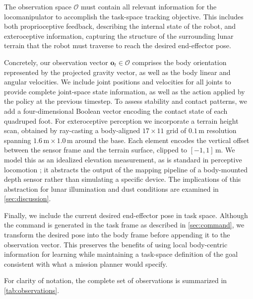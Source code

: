 The observation space $\mathcal{O}$ must contain all relevant information for the locomanipulator to accomplish the task-space tracking objective. This includes both proprioceptive feedback, describing the internal state of the robot, and exteroceptive information, capturing the structure of the surrounding lunar terrain that the robot must traverse to reach the desired end-effector pose.

Concretely, our observation vector $\boldsymbol{o}_t \in \mathcal{O}$ comprises the body orientation represented by the projected gravity vector, as well as the body linear and angular velocities. We include joint positions and velocities for all joints to provide complete joint-space state information, as well as the action applied by the policy at the previous timestep. To assess stability and contact patterns, we add a four-dimensional Boolean vector encoding the contact state of each quadruped foot. For exteroceptive perception we incorporate a terrain height scan, obtained by ray-casting a body-aligned $17\times11$ grid of $0.1\,$m resolution spanning $1.6\,\mathrm{m}\times1.0\,\mathrm{m}$ around the base. Each element encodes the vertical offset between the sensor frame and the terrain surface, clipped to $[-1,1]\,$m. We model this as an idealized elevation measurement, as is standard in perceptive locomotion \citep{MikiWildAnymal}; it abstracts the output of the mapping pipeline of a body-mounted depth sensor rather than simulating a specific device. The implications of this abstraction for lunar illumination and dust conditions are examined in \cref{sec:discussion}.

Finally, we include the current desired end-effector pose in task space. Although the command is generated in the task frame as described in \cref{sec:command}, we transform the desired pose into the body frame before appending it to the observation vector. This preserves the benefits of using local body-centric information for learning while maintaining a task-space definition of the goal consistent with what a mission planner would specify.

For clarity of notation, the complete set of observations is summarized in \cref{tab:observations}.

